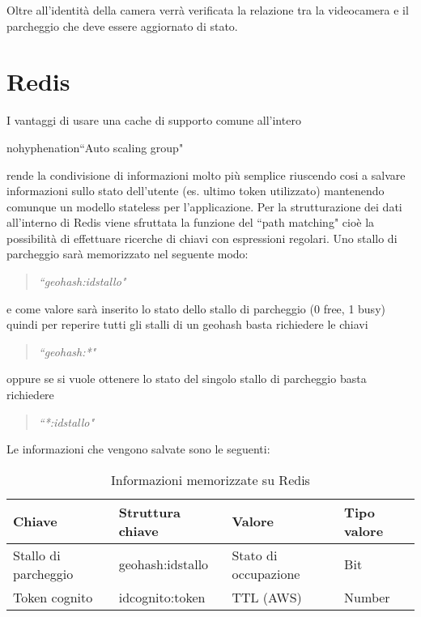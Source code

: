 Oltre all'identità della camera verrà verificata la relazione tra la videocamera e il parcheggio che deve essere aggiornato di stato.






\section{Redis}
I vantaggi di usare una cache di supporto comune all'intero \begin{hyphenrules}{nohyphenation}``Auto scaling group"\end{hyphenrules} rende la condivisione di informazioni molto più semplice riuscendo cosi a salvare informazioni sullo stato dell'utente (es. ultimo token utilizzato) mantenendo comunque un modello stateless per l'applicazione. Per la strutturazione dei dati all'interno di Redis viene sfruttata la funzione del ``path matching" cioè la possibilità di effettuare ricerche di chiavi con espressioni regolari. Uno stallo di parcheggio sarà memorizzato nel seguente modo:
\begin{quotation}
\textit{``geohash:idstallo"}
\end{quotation}
 e come valore sarà inserito lo stato dello stallo di parcheggio (0 free, 1 busy)
quindi per reperire tutti gli stalli di un geohash basta richiedere le chiavi 
\begin{quotation}
\textit{``geohash:*"}
\end{quotation}
 oppure  se si vuole ottenere lo stato del singolo stallo di parcheggio basta richiedere 
\begin{quotation}
\textit{``*:idstallo"}
\end{quotation} 
Le informazioni che vengono salvate sono le seguenti:

\begin{table}[htb]
\centering
\caption{Informazioni memorizzate su Redis}
\label{my-label}
\begin{tabular}{|l|l|l|l|}
\hline
Chiave               & Struttura chiave & Valore               & Tipo valore \\ \hline
Stallo di parcheggio & geohash:idstallo & Stato di occupazione & Bit         \\ \hline
Token cognito        & idcognito:token  & TTL (AWS)                 & Number      \\ \hline
\end{tabular}
\end{table}


